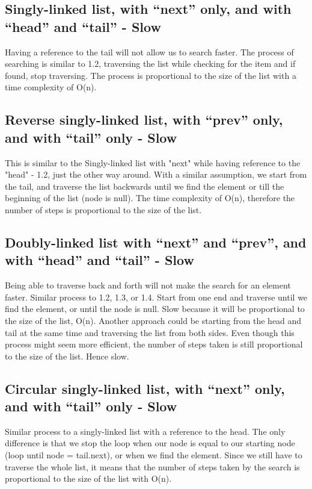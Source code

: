 \documentclass{article}
\begin{document}
\subsection{Singly-linked list, with “next” only, and with “head” and “tail” - Slow}
Having a reference to the tail will not allow us to search faster. The process of searching is similar to 1.2, traversing the list while checking for the item and if found, stop traversing. The process is proportional to the size of the list with a time complexity of O(n).

\subsection{Reverse singly-linked list, with “prev” only, and with “tail” only - Slow}
This is similar to the Singly-linked list with "next" while having reference to the "head" - 1.2, just the other way around. With a similar assumption, we start from the tail, and traverse the list backwards until we find the element or till the beginning of the list (node is null). The time complexity of O(n), therefore the number of steps is proportional to the size of the list.

\subsection{Doubly-linked list with “next” and “prev”, and with “head” and “tail” - Slow}
Being able to traverse back and forth will not make the search for an element faster. Similar process to 1.2, 1.3, or 1.4. Start from one end and traverse until we find the element, or until the node is null. Slow because it will be proportional to the size of the list, O(n).
Another approach could be starting from the head and tail at the same time and traversing the list from both sides. Even though this process might seem more efficient, the number of steps taken is still proportional to the size of the list. Hence slow.

\subsection{Circular singly-linked list, with “next” only, and with “tail” only - Slow}
Similar process to a singly-linked list with a reference to the head. The only difference is that we stop the loop when our node is equal to our starting node (loop until node = tail.next), or when we find the element. Since we still have to traverse the whole list, it means that the number of steps taken by the search is proportional to the size of the list with O(n).
\end{document}
